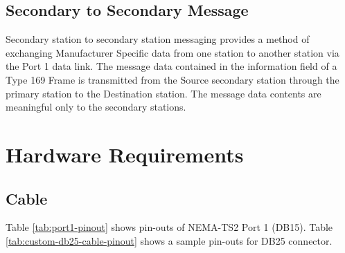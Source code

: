 \documentclass[]{article}
\begin{document}
\clearpage

\subsection{Secondary to Secondary Message}
Secondary station to secondary station messaging provides a method of exchanging Manufacturer
Specific data from one station to another station via the Port 1 data link. The message data contained in the information field of a Type 169 Frame is transmitted from the Source secondary station through the primary station to the Destination station. The message data contents are meaningful only to the
secondary stations.

\clearpage\section {Hardware Requirements}


\subsection{Cable}
Table \ref{tab:port1-pinout} shows pin-outs of NEMA-TS2 Port 1 (DB15). Table \ref{tab:custom-db25-cable-pinout} shows a sample pin-outs for DB25 connector.
\end{document}

